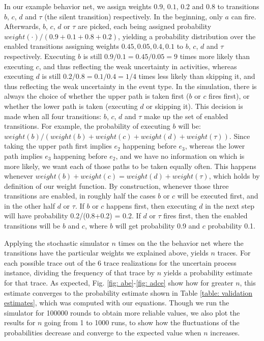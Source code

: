 In our example behavior net, we assign weights $0.9$, $0.1$, $0.2$ and $0.8$ to transitions $b$, $c$, $d$ and $\tau$ (the silent transition) respectively.
In the beginning, only $a$ can fire.
Afterwards, $b$, $c$, $d$ or $\tau$ are picked, each being assigned probability $weight(\cdot)/ (0.9+0.1+0.8+0.2)$, yielding a probability distribution over the enabled transitions assigning weights $0.45,0.05,0.4,0.1$ to $b$, $c$, $d$ and $\tau$ respectively. 
Executing $b$ is still $0.9/0.1=0.45/0.05=9$ times more likely than executing $c$, and thus reflecting the weak uncertainty in activities, whereas executing $d$ is still $0.2/0.8=0.1/0.4=1/4$ times less likely than skipping it, and thus reflecting the weak uncertainty in the event type.
In the simulation, there is always the choice of whether the upper path is taken first ($b$ or $c$ fires first), or whether the lower path is taken (executing $d$ or skipping it). 
This decision is made when all four transitions: $b$, $c$, $d$ and $\tau$ make up the set of enabled transitions. 
For example, the probability of executing $b$ will be:
$weight(b)/(weight(b)+weight(c)+weight(d)+weight(\tau))$. 
Since taking the upper path first implies $e_2$ happening before $e_3$, whereas the lower path implies $e_3$ happening before $e_2$, and we have no information on which is more likely, we want each of those paths to be taken equally often. 
This happens whenever $weight(b) + weight(c)=weight(d)+weight(\tau)$, which holds by definition of our weight function.
By construction, whenever those three transitions are enabled, in roughly half the cases $b$ or $c$ will be executed first, and in the other half $d$ or $\tau$.
If $b$ or $c$ happens first, then executing $d$ in the next step will have probability 0.2/(0.8+0.2) = 0.2. 
If $d$ or $\tau$ fires first, then the enabled transitions will be $b$ and $c$, where $b$ will get probability 0.9 and $c$ probability 0.1.

Applying the stochastic simulator $n$ times on the the behavior net where the transitions have the particular weights we explained above, yields $n$ traces.
For each possible trace out of the 6 trace realizations for the uncertain process instance, dividing the frequency of that trace by $n$ yields a probability estimate for that trace.
As expected, Fig. \ref{fig: abe}-\ref{fig: adce} show how for greater $n$, this estimate converges to the probability estimate shown in Table \ref{table: validation estimates}, which was computed with our equations.
Though we run the simulator for 100000 rounds to obtain more reliable values, we also plot the results for $n$ going from 1 to 1000 runs, to show how the fluctuations of the probabilities decrease and converge to the expected value when $n$ increases.


